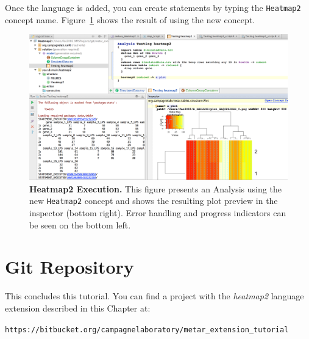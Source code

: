 Once the language is added, you can create statements by typing the \texttt{Heatmap2} concept name. Figure~\ref{fig:Heatmap2_Execution} shows the result of using the new concept. 

\begin{figure}[h!tbp]
  \centering
  \includegraphics[width=\figWidthWide]{figures/Heatmap2_Execution.png}
\caption[Heatmap2 Execution.]{\textbf{Heatmap2 Execution.} This figure presents an Analysis using the new \texttt{Heatmap2} concept and shows the resulting plot preview in the inspector (bottom right). Error handling and progress indicators can be seen on the bottom left.}
\label{fig:Heatmap2_Execution}
\end{figure}



\section{Git Repository}
This concludes this tutorial. You can find a project with the \textit{heatmap2} language extension described in this Chapter at: \newline
\begin{flushright}
\texttt{https://bitbucket.org/\allowbreak{}campagnelaboratory\allowbreak{}/}\newline\texttt{metar\allowbreak{}\_extension\allowbreak{}\_tutorial}
\end{flushright}

